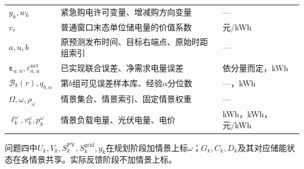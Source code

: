 \begin{table}[H]
\begin{tabular}{lp{8.3cm}l}
$y_k,w_k$ & 紧急购电许可变量、增减购方向变量 & --- \\
$v_r$ & 普通窗口末态单位储电量的价值系数 & 元/kWh \\
$a,u,b$ & 原预测发布时间、目标右端点、原始时距组索引 & --- \\
$\boldsymbol\varepsilon_{a,u},\varepsilon_{a,u}^{\mathrm{net}}$ & 已实现联合误差、净需求电量误差 & 依分量而定，kWh \\
$\mathcal B_b(r),q_{b,\alpha}$ & 第$b$组可见误差样本库、经验$\alpha$分位数 & ---，kWh \\
$\Omega,\omega,\rho_\omega$ & 情景集合、情景索引、固定情景权重 & --- \\
$\ell_k^\omega,v_k^\omega,p_k^\omega$ & 情景负载电量、光伏电量、电价 & kWh，kWh，元/kWh \\
\bottomrule
\end{tabular}
\end{table}
问题四中$U_k,V_k,S_k^{\mathrm{PV}},S_k^{\mathrm{grid}},y_k$在规划阶段加情景上标$\omega$；$G_k,C_k,D_k$及其对应储能状态在各情景共享。实际反馈阶段不加情景上标。
\FloatBarrier
